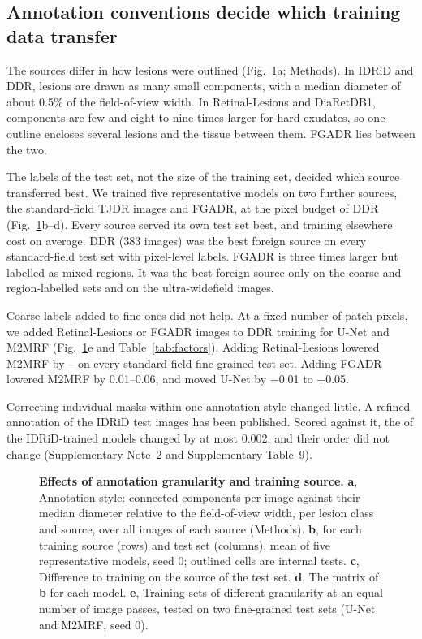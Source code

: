 \subsection{Annotation conventions decide which training data transfer}
The sources differ in how lesions were outlined (Fig.~\ref{fig:sources}a; Methods). In IDRiD and DDR, lesions are drawn as many small components, with a median diameter of about 0.5\% of the field-of-view width. In Retinal-Lesions and DiaRetDB1, components are few and eight to nine times larger for hard exudates, so one outline encloses several lesions and the tissue between them. FGADR lies between the two.

The labels of the test set, not the size of the training set, decided which source transferred best. We trained five representative models on two further sources, the standard-field TJDR images and FGADR, at the pixel budget of DDR (Fig.~\ref{fig:sources}b--d). Every source served its own test set best, and training elsewhere cost  \mAUPR{} on average. DDR (383 images) was the best foreign source on every standard-field test set with pixel-level labels. FGADR is three times larger but labelled as mixed regions. It was the best foreign source only on the coarse and region-labelled sets and on the ultra-widefield images.

Coarse labels added to fine ones did not help. At a fixed number of patch pixels, we added Retinal-Lesions or FGADR images to DDR training for U-Net and M2MRF (Fig.~\ref{fig:sources}e and Table~\ref{tab:factors}). Adding Retinal-Lesions lowered M2MRF by -- on every standard-field fine-grained test set. Adding FGADR lowered M2MRF by 0.01--0.06, and moved U-Net by $-$0.01 to +0.05.

Correcting individual masks within one annotation style changed little. A refined annotation of the IDRiD test images has been published\cite{chankhachon2026refinedidrid}. Scored against it, the \mAUPR{} of the  IDRiD-trained models changed by at most 0.002, and their order did not change (Supplementary Note~2 and Supplementary Table~9).

\begin{figure}[t]
\centering
{}
\caption{\textbf{Effects of annotation granularity and training source.} \textbf{a}, Annotation style: connected components per image against their median diameter relative to the field-of-view width, per lesion class and source, over all images of each source (Methods). \textbf{b}, \mAUPR{} for each training source (rows) and test set (columns), mean of five representative models, seed 0; outlined cells are internal tests. \textbf{c}, Difference to training on the source of the test set. \textbf{d}, The matrix of \textbf{b} for each model. \textbf{e}, Training sets of different granularity at an equal number of image passes, tested on two fine-grained test sets (U-Net and M2MRF, seed 0).}
\label{fig:sources}
\end{figure}

